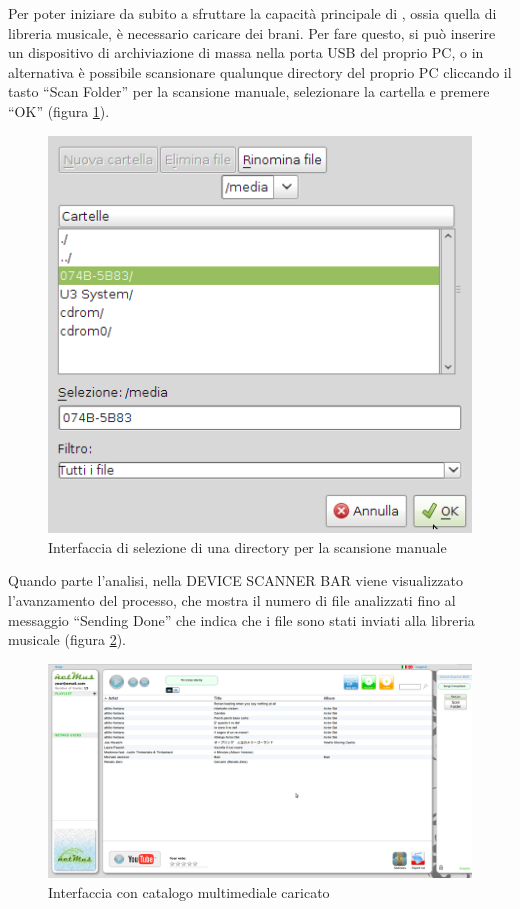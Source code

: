 Per poter iniziare da subito a sfruttare la capacit\`a principale di ,
ossia quella di libreria musicale, \`e necessario caricare dei brani.
Per fare questo, si pu\`o inserire un dispositivo di archiviazione di massa
nella porta USB del proprio PC, o in alternativa \`e possibile scansionare
qualunque directory del proprio PC cliccando il tasto ``Scan Folder'' per la scansione manuale,
selezionare la cartella e premere ``OK'' (figura \ref{fig:scansioneManuale}).\\
\begin{figure}[!htbp]
  \centering
  \includegraphics[width=14cm]{img/MU/scan_manual.png}
\caption{Interfaccia di selezione di una directory per la scansione
manuale}
\label{fig:scansioneManuale}
\end{figure}

Quando parte l'analisi, nella DEVICE SCANNER BAR viene visualizzato
l'avanzamento del processo, che mostra il numero di file analizzati fino al
messaggio ``Sending Done'' che indica che i file sono stati inviati alla
libreria musicale (figura \ref{fig:fineUpload}).
\begin{figure}[!htbp]
  \centering
  \includegraphics[width=14cm]{img/MU/song_loaded.png}
\caption{Interfaccia con catalogo multimediale caricato}
\label{fig:fineUpload}
\end{figure}

